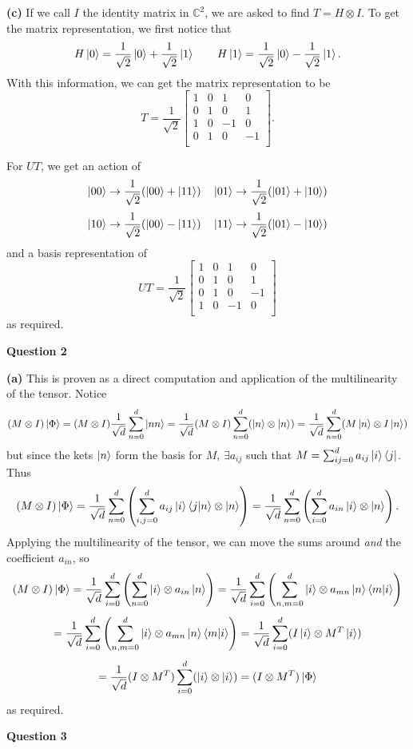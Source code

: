 \documentclass[10pt]{article}
\newcommand{\C}{\mathbb{C}}
\begin{document}
\textbf{(c)} If we call $I$ the identity matrix in $\C^{2}$, we are asked to find $T = H \otimes I$. To get the matrix representation, we first notice that
\[ H\ket{0} = \frac{1}{\sqrt{2}}\ket{0} + \frac{1}{\sqrt{2}}\ket{1} \hspace{2em} H\ket{1} = \frac{1}{\sqrt{2}}\ket{0} - \frac{1}{\sqrt{2}}\ket{1}.\]
With this information, we can get the matrix representation to be
\[ T = \frac{1}{\sqrt{2}}
\begin{bmatrix}
  1 & 0 & 1 & 0 \\
  0 & 1 & 0 & 1 \\
  1 & 0 & -1 & 0 \\
  0 & 1 & 0 & -1 \\
\end{bmatrix}.
\]

For $UT$, we get an action of
\[ \ket{00} \to \frac{1}{\sqrt{2}}(\ket{00}+\ket{11}) \hspace{1em} \ket{01} \to \frac{1}{\sqrt{2}}(\ket{01}+\ket{10}) \]
\[ \ket{10} \to \frac{1}{\sqrt{2}}(\ket{00}-\ket{11}) \hspace{1em} \ket{11} \to \frac{1}{\sqrt{2}}(\ket{01}-\ket{10})\]
and a basis representation of
\[ UT = \frac{1}{\sqrt{2}}
\begin{bmatrix}
  1 & 0 & 1 & 0 \\
  0 & 1 & 0 & 1 \\
  0 & 1 & 0 & -1 \\
  1 & 0 & -1 & 0 \\
\end{bmatrix}
\]
as required.

\newpage
\textbf{Question 2}

\textbf{(a)} This is proven as a direct computation and application of the multilinearity of the tensor. Notice
\[ (M\otimes I)\ket{\Phi} = (M\otimes I)\frac{1}{\sqrt{d}}\sum_{n=0}^{d}\ket{nn} = \frac{1}{\sqrt{d}}(M\otimes I)\sum_{n=0}^{d}(\ket{n}\otimes\ket{n}) = \frac{1}{\sqrt{d}}\sum_{n=0}^{d}(M\ket{n}\otimes I\ket{n})\]
but since the kets $\ket{n}$ form the basis for $M$, $\exists a_{ij}$ such that $M = \sum_{ij=0}^{d}a_{ij}\ket{i}\bra{j}$. Thus
\[ (M\otimes I)\ket{\Phi} = \frac{1}{\sqrt{d}}\sum_{n=0}^{d}\left(\sum_{i,j=0}^{d}a_{ij}\ket{i}\braket{j|n} \otimes \ket{n} \right) = \frac{1}{\sqrt{d}}\sum_{n=0}^{d}\left(\sum_{i=0}^{d}a_{in}\ket{i} \otimes \ket{n} \right).\]
Applying the multilinearity of the tensor, we can move the sums around \textit{and} the coefficient $a_{in}$, so
\[ (M\otimes I)\ket{\Phi} = \frac{1}{\sqrt{d}}\sum_{i=0}^{d}\left(\sum_{n=0}^{d}\ket{i} \otimes a_{in}\ket{n} \right) = \frac{1}{\sqrt{d}}\sum_{i=0}^{d}\left(\sum_{n,m=0}^{d}\ket{i} \otimes a_{mn}\ket{n}\braket{m|i} \right)\]
\[ = \frac{1}{\sqrt{d}}\sum_{i=0}^{d}\left(\sum_{n,m=0}^{d}\ket{i} \otimes a_{mn}\ket{n}\braket{m|i} \right) = \frac{1}{\sqrt{d}} \sum_{i=0}^{d}(I\ket{i} \otimes M^{T}\ket{i})\]
\[ = \frac{1}{\sqrt{d}}(I\otimes M^{T})\sum_{i=0}^{d}(\ket{i}\otimes\ket{i}) = (I\otimes M^{T})\ket{\Phi} \]
as required.

\newpage
\textbf{Question 3}
\end{document}

